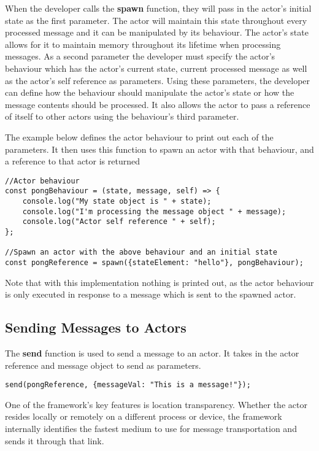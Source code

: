 \documentclass[12pt, a4paper]{report}
\theoremstyle{definition}
\theoremstyle{definition}%
\theoremstyle{definition}%
\theoremstyle{definition}%
\theoremstyle{definition}%
\theoremstyle{definition}%
\begin{document}
When the developer calls the \textbf{spawn} function, they will pass in the actor's initial state as the first parameter. The actor will maintain this state throughout every processed message and it can be manipulated by its behaviour. The actor's state allows for it to maintain memory throughout its lifetime when processing messages. As a second parameter the developer must specify the actor's behaviour which has the actor's current state, current processed message as well as the actor's self reference as parameters. Using these parameters, the developer can define how the behaviour should manipulate the actor's state or how the message contents should be processed. It also allows the actor to pass a reference of itself to other actors using the behaviour's third parameter.

The example below defines the actor behaviour to print out each of the parameters. It then uses this function to spawn an actor with that behaviour, and a reference to that actor is returned
\begin{lstlisting}
//Actor behaviour
const pongBehaviour = (state, message, self) => {
    console.log("My state object is " + state);
    console.log("I'm processing the message object " + message);
    console.log("Actor self reference " + self);
};

//Spawn an actor with the above behaviour and an initial state
const pongReference = spawn({stateElement: "hello"}, pongBehaviour);
\end{lstlisting}
Note that with this implementation nothing is printed out, as the actor behaviour is only executed in response to a message which is sent to the spawned actor.
\subsection{Sending Messages to Actors}
The \textbf{send} function is used to send a message to an actor. It takes in the actor reference and message object to send as parameters.
\begin{lstlisting}
send(pongReference, {messageVal: "This is a message!"});
\end{lstlisting}
One of the framework's key features is location transparency. Whether the actor resides locally or remotely on a different process or device, the framework internally identifies the fastest medium to use for message transportation and sends it through that link.
\end{document}
